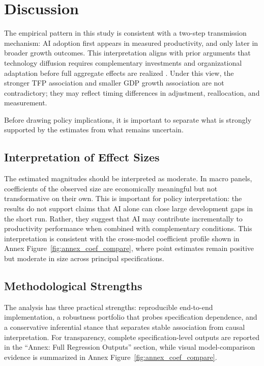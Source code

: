 \section{Discussion}

The empirical pattern in this study is consistent with a two-step transmission mechanism: AI adoption first appears in measured productivity, and only later in broader growth outcomes. This interpretation aligns with prior arguments that technology diffusion requires complementary investments and organizational adaptation before full aggregate effects are realized \cite{brynjolfssonRockSyverson2019,brynjolfssonHitt2000}. Under this view, the stronger TFP association and smaller GDP growth association are not contradictory; they may reflect timing differences in adjustment, reallocation, and measurement.

Before drawing policy implications, it is important to separate what is strongly supported by the estimates from what remains uncertain.

\subsection{Interpretation of Effect Sizes}

The estimated magnitudes should be interpreted as moderate. In macro panels, coefficients of the observed size are economically meaningful but not transformative on their own. This is important for policy interpretation: the results do not support claims that AI alone can close large development gaps in the short run. Rather, they suggest that AI may contribute incrementally to productivity performance when combined with complementary conditions.
This interpretation is consistent with the cross-model coefficient profile shown in Annex Figure~\ref{fig:annex_coef_compare}, where point estimates remain positive but moderate in size across principal specifications.

\subsection{Methodological Strengths}

The analysis has three practical strengths: reproducible end-to-end implementation, a robustness portfolio that probes specification dependence, and a conservative inferential stance that separates stable association from causal interpretation. For transparency, complete specification-level outputs are reported in the ``Annex: Full Regression Outputs'' section, while visual model-comparison evidence is summarized in Annex Figure~\ref{fig:annex_coef_compare}.

